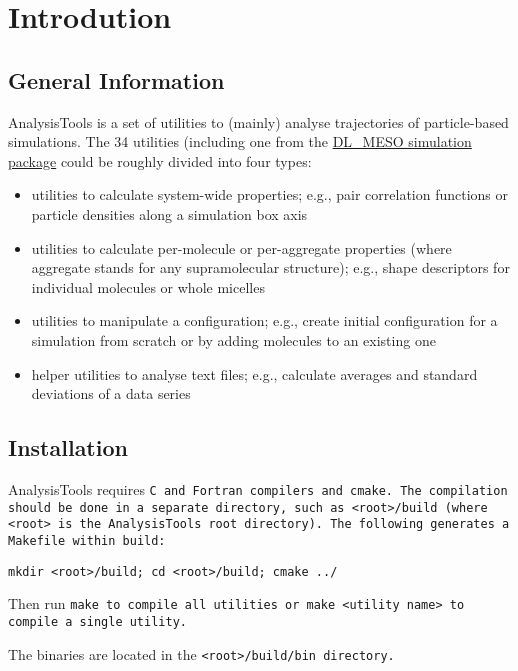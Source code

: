 \chapter{Introdution}

\section{General Information}
AnalysisTools is a set of utilities to (mainly) analyse trajectories of
particle-based simulations. The 34 utilities (including one
from the \href{https://www.scd.stfc.ac.uk/Pages/DL_MESO.aspx}{DL\_MESO
simulation package} could be roughly divided into four types:

\begin{itemize}
  \item utilities to calculate system-wide properties; e.g., pair
    correlation functions or particle densities along a simulation box axis
  \item utilities to calculate per-molecule or per-aggregate properties
    (where aggregate stands for any supramolecular structure); e.g., shape
    descriptors for individual molecules or whole micelles
  \item utilities to manipulate a configuration; e.g., create initial
    configuration for a simulation from scratch or by adding molecules to
    an existing one
  \item helper utilities to analyse text files; e.g., calculate averages
    and standard deviations of a data series
\end{itemize}

\section{Installation}

AnalysisTools requires \tt{C} and \tt{Fortran} compilers and \tt{cmake}.
The compilation should be done in a separate directory, such as
\tt{<root>/build} (where \tt{<root>} is the AnalysisTools root
directory). The following generates a \tt{Makefile} within \tt{build}:

\tt{mkdir <root>/build; cd <root>/build; cmake ../}

Then run \tt{make} to compile all utilities or \tt{make <utility name>} to
compile a single utility.

The binaries are located in the \tt{<root>/build/bin} directory.
